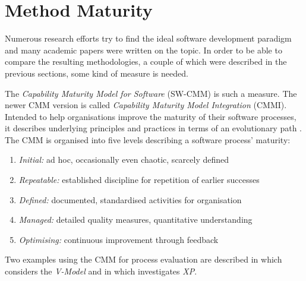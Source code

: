 %
%
%
%
%
%
%

\section{Method Maturity}
\label{method_maturity_heading}

Numerous research efforts try to find the ideal software development paradigm and
many academic papers were written on the topic. In order to be able to compare
the resulting methodologies, a couple of which were described in the previous
sections, some kind of measure is needed.

The \emph{Capability Maturity Model for Software} (SW-CMM) \cite{paulk} is such
a measure. The newer CMM version is called
\emph{Capability Maturity Model Integration} (CMMI). Intended to help
organisations improve the maturity of their software processes, it describes
underlying principles and practices in terms of an evolutionary path
\cite{cmm}. The CMM is organised into five levels describing a software
process' maturity:

\begin{enumerate}
    \item \emph{Initial:} ad hoc, occasionally even chaotic, scarcely defined
    \item \emph{Repeatable:} established discipline for repetition of earlier successes
    \item \emph{Defined:} documented, standardised activities for organisation
    \item \emph{Managed:} detailed quality measures, quantitative understanding
    \item \emph{Optimising:} continuous improvement through feedback
\end{enumerate}

Two examples using the CMM for process evaluation are described in
\cite{schuppan} which considers the \emph{V-Model} and in \cite{paulkxp} which
investigates \emph{XP}.
